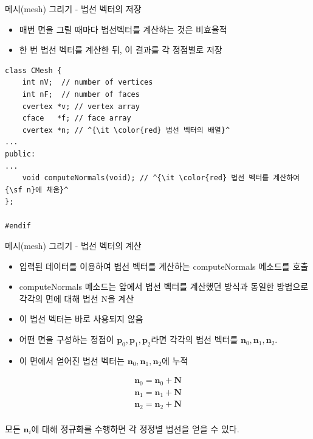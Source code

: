\documentclass{beamer}
\begin{document}
\begin{frame}[fragile]{메시(mesh) 그리기 - 법선 벡터의 저장}

\begin{itemize}
\item 매번 면을 그릴 때마다 법선벡터를 계산하는 것은 비효율적
\item 한 번 법선 벡터를 계산한 뒤, 이 결과를 각 정점별로 저장
\end{itemize}

\lstset{language=C++, escapechar=^} 
\begin{lstlisting}
class CMesh {
    int nV;  // number of vertices
    int nF;  // number of faces
    cvertex *v; // vertex array
    cface   *f; // face array
    cvertex *n; // ^{\it \color{red} 법선 벡터의 배열}^
...
public:
...
    void computeNormals(void); // ^{\it \color{red} 법선 벡터를 계산하여 {\sf n}에 채움}^
};

#endif
\end{lstlisting}

\end{frame}

\begin{frame}[fragile]{메시(mesh) 그리기 - 법선 벡터의 계산}

\begin{itemize}
\item 입력된 데이터를 이용하여 법선 벡터를 계산하는 {\sf computeNormals} 메소드를 호출
\item {\sf computeNormals} 메소드는 앞에서 법선 벡터를 계산했던 방식과 동일한 방법으로 각각의 면에 대해 법선 {\sf N}을 계산
\item 이 법선 벡터는 바로 사용되지 않음
\item 어떤 면을 구성하는 정점이 $\mathbf p_0, \mathbf p_1, \mathbf p_2$라면 각각의 법선 벡터를 $\mathbf n_0, \mathbf n_1, \mathbf n_2$.
\item 이 면에서 얻어진 법선 벡터는 $\mathbf n_0, \mathbf n_1, \mathbf n_2$에 누적
\end{itemize}
\begin{eqnarray} \nonumber
\mathbf n_0 = \mathbf n_0 + {\mathbf N} \\ \nonumber
\mathbf n_1 = \mathbf n_1 + {\mathbf N} \\ \nonumber
\mathbf n_2 = \mathbf n_2 + {\mathbf N} \\ \nonumber
\end{eqnarray}

모든 $\mathbf n_i$에 대해 정규화를 수행하면 각 정정별 법선을 얻을 수 있다.

\end{frame}
\end{document}
